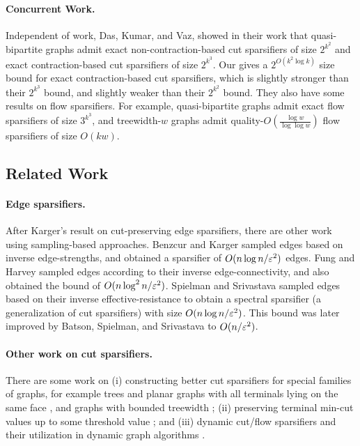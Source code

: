\paragraph{Concurrent Work.} Independent of work, Das, Kumar, and Vaz, showed in their work \cite{das2024nearly} that quasi-bipartite graphs admit exact non-contraction-based cut sparsifiers of size $2^{k^2}$ and exact contraction-based cut sparsifiers of size $2^{k^3}$. Our  gives a $2^{O(k^2\log k)}$ size bound for exact contraction-based cut sparsifiers, which is slightly stronger than their $2^{k^3}$ bound, and slightly weaker than their $2^{k^2}$ bound. They also have some results on flow sparsifiers. For example, quasi-bipartite graphs admit exact flow sparsifiers of size $3^{k^3}$, and treewidth-$w$ graphs admit quality-$O(\frac{\log w}{\log\log w})$ flow sparsifiers of size $O(kw)$.




\subsection{Related Work}
\label{sec: related}

\paragraph{Edge sparsifiers.} 
After Karger's result \cite{karger1999random} on cut-preserving edge sparsifiers, there are other work using sampling-based approaches. Benzcur and Karger \cite{benczur1996approximate} sampled edges based on inverse edge-strengths, and obtained a sparsifier of $O(n\log n/{\varepsilon}^2)$ edges. Fung and Harvey \cite{fung2010graph} sampled edges according to their inverse edge-connectivity, and also obtained the bound of $O(n\log^2 n/{\varepsilon}^2)$. Spielman and Srivastava \cite{spielman2011graph} sampled edges based on their inverse effective-resistance to obtain a spectral sparsifier (a generalization of cut sparsifiers) with size $O(n\log n/{\varepsilon}^2)$. This bound was later improved by Batson, Spielman, and Srivastava \cite{batson2012twice} to $O(n/{\varepsilon}^2)$.

\paragraph{Other work on cut sparsifiers.}
There are some work on (i) constructing better cut sparsifiers for  special families of graphs, for example trees \cite{goranci2017vertex} and planar graphs with all terminals lying on the same face \cite{goranci2017improved}, and graphs with bounded treewidth \cite{andoni2014towards}; (ii) preserving terminal min-cut values up to some threshold value \cite{chalermsook2021vertex,liu2020vertex}; and
(iii) dynamic cut/flow sparsifiers and their utilization in dynamic graph algorithms \cite{durfee2019fully,chen2020fast,goranci2021expander}.


